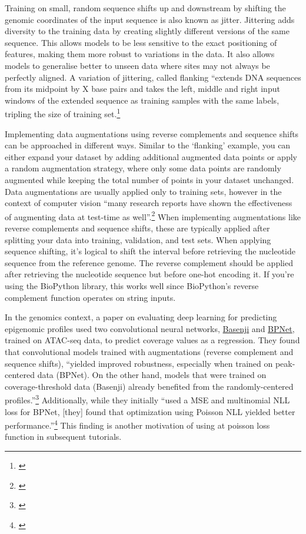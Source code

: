 \documentclass[
]{book}
\begin{document}
Training on small, random sequence shifts up and downstream by shifting the genomic coordinates of the input sequence is also known as jitter. Jittering adds diversity to the training data by creating slightly different versions of the same sequence. This allows models to be less sensitive to the exact positioning of features, making them more robust to variations in the data. It also allows models to generalise better to unseen data where sites may not always be perfectly aligned. A variation of jittering, called flanking ``extends DNA sequences from its midpoint by X base pairs and takes the left, middle and right input windows of the extended sequence as training samples with the same labels, tripling the size of training set.\footnote{\citet{cao2019}}

Implementing data augmentations using reverse complements and sequence shifts can be approached in different ways. Similar to the `flanking' example, you can either expand your dataset by adding additional augmented data points or apply a random augmentation strategy, where only some data points are randomly augmented while keeping the total number of points in your dataset unchanged. Data augmentations are usually applied only to training sets, however in the context of computer vision ``many research reports have shown the effectiveness of augmenting data at test-time as well''.\footnote{\citet{connor2019}} When implementing augmentations like reverse complements and sequence shifts, these are typically applied after splitting your data into training, validation, and test sets. When applying sequence shifting, it's logical to shift the interval before retrieving the nucleotide sequence from the reference genome. The reverse complement should be applied after retrieving the nucleotide sequence but before one-hot encoding it. If you're using the BioPython library, this works well since BioPython's reverse complement function operates on string inputs.

In the genomics context, a paper on evaluating deep learning for predicting epigenomic profiles used two convolutional neural networks, \href{https://github.com/calico/basenji}{Basenji} and \href{https://github.com/kundajelab/bpnet}{BPNet}, trained on ATAC-seq data, to predict coverage values as a regression. They found that convolutional models trained with augmentations (reverse complement and sequence shifts), ``yielded improved robustness, especially when trained on peak-centered data (BPNet). On the other hand, models that were trained on coverage-threshold data (Basenji) already benefited from the randomly-centered profiles.''\footnote{\citet{toneyan2022}} Additionally, while they initially ``used a MSE and multinomial NLL loss for BPNet, {[}they{]} found that optimization using Poisson NLL yielded better performance.''\footnote{\citet{toneyan2022}} This finding is another motivation of using at poisson loss function in subsequent tutorials.
\end{document}
